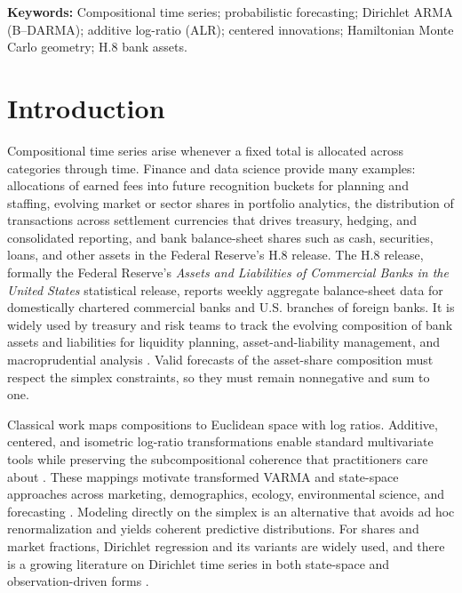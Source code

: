 \documentclass[12pt]{article}
\theoremstyle{remark}
\begin{document}
\noindent\textbf{Keywords:} Compositional time series; probabilistic forecasting; Dirichlet ARMA (B--DARMA); additive log-ratio (ALR); centered innovations; Hamiltonian Monte Carlo geometry; H.8 bank assets.

\section{Introduction}\label{sec:intro}

Compositional time series arise whenever a fixed total is allocated across categories through time. Finance and data science provide many examples: allocations of earned fees into future recognition buckets for planning and staffing, evolving market or sector shares in portfolio analytics, the distribution of transactions across settlement currencies that drives treasury, hedging, and consolidated reporting, and bank balance-sheet shares such as cash, securities, loans, and other assets in the Federal Reserve's H.8 release. The H.8 release, formally the Federal Reserve's \emph{Assets and Liabilities of Commercial Banks in the United States} statistical release, reports weekly aggregate balance-sheet data for domestically chartered commercial banks and U.S. branches of foreign banks. It is widely used by treasury and risk teams to track the evolving composition of bank assets and liabilities for liquidity planning, asset-and-liability management, and macroprudential analysis \citep{boardgovernors2024h8}. Valid forecasts of the asset-share composition must respect the simplex constraints, so they must remain nonnegative and sum to one.

Classical work maps compositions to Euclidean space with log ratios. Additive, centered, and isometric log-ratio transformations enable standard multivariate tools while preserving the subcompositional coherence that practitioners care about \citep{aitchison1982statistical, egoszcue2003isometric}. These mappings motivate transformed VARMA and state-space approaches across marketing, demographics, ecology, environmental science, and forecasting \citep{Cargnoni1997BayesianFO, ravishanker2001compositional, silva2001modelling, brunsdon1998time, mills2010forecasting, barcelo2011compositional, koehler2010forecasting, kynvclova2015modeling, snyder2017forecasting, al2018compositional}. Modeling directly on the simplex is an alternative that avoids ad hoc renormalization and yields coherent predictive distributions. For shares and market fractions, Dirichlet regression and its variants are widely used, and there is a growing literature on Dirichlet time series in both state-space and observation-driven forms \citep{hijazi2009modelling, grunwald1993time, da2011dynamic, da2015bayesian, zheng2017dirichlet, morais2018using, giller2020generalized, creus2021dirichlet, tsagris2018dirichlet}.
\end{document}
